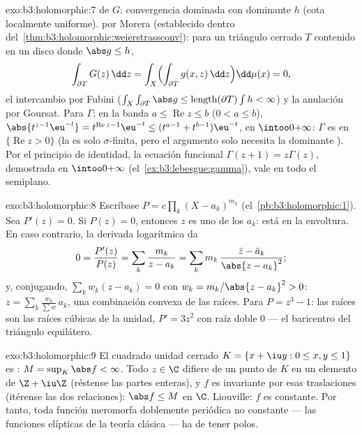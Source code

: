 \begin{solution}{exo:b3:holomorphic:7}
 de $G$: convergencia
dominada con dominante $h$ (cota localmente uniforme).
 por Morera (establecido
dentro del~\cref{thm:b3:holomorphic:weierstrassconv}): para un triángulo
cerrado $T$ contenido en un disco donde $\abs g \leq h$,
\[
\int_{\partial T}G(z)\,\dd z =
\int_X\Bigl(\int_{\partial T}g(x, z)\,\dd z\Bigr)\dd\mu(x) =
0,
\]
el intercambio por Fubini ($\int_X\int_{\partial T}\abs
g \leq \operatorname{length}(\partial T)\int h < \infty$) y la anulación
 por Goursat. Para $\Gamma$: en la banda $a
\leq \operatorname{Re}z \leq b$ ($0 < a \leq b$),
$\abs{t^{z-1}\eu^{-t}} = t^{\operatorname{Re}z-1}\eu^{-t} \leq
(t^{a-1} + t^{b-1})\eu^{-t}$,  en
$\intoo0{+\infty}$: $\Gamma$ es
 en
$\{\operatorname{Re} z > 0\}$ (la
 es solo $\sigma$-finita, pero el
argumento solo necesita la dominante
). Por el principio de identidad,
la ecuación funcional $\Gamma(z + 1) = z\Gamma(z)$, demostrada en
$\intoo0{+\infty}$ (el~\cref{ex:b3:lebesgue:gamma}), vale en todo el
semiplano.
\end{solution}

\begin{solution}{exo:b3:holomorphic:8}
Escríbase $P = c\prod_k(X - a_k)^{m_k}$ (el~\cref{pb:b3:holomorphic:1}).
Sea $P'(z) = 0$. Si $P(z) = 0$, entonces $z$ es uno de los $a_k$: está
en la envoltura. En caso contrario, la derivada logarítmica da
\[
0 = \frac{P'(z)}{P(z)} = \sum_k\frac{m_k}{z - a_k}
= \sum_k m_k\,\frac{\bar z - \bar a_k}{\abs{z - a_k}^2} ;
\]
y, conjugando, $\sum_kw_k(z - a_k) = 0$ con $w_k = m_k/\abs{z -
a_k}^2 > 0$: $z = \sum_k\frac{w_k}{\sum w}\,a_k$, una combinación
convexa de las raíces. Para $P = z^3 - 1$: las raíces son las raíces
cúbicas de la unidad, $P' = 3z^2$ con raíz doble $0$ --- el baricentro
del triángulo equilátero.
\end{solution}

\begin{solution}{exo:b3:holomorphic:9}
El cuadrado unidad cerrado $K = \{x + \iu y : 0 \leq x, y \leq
1\}$ es :
$M = \sup_K\abs f < \infty$. Todo $z \in \C$ difiere de un punto de $K$
en un elemento de $\Z + \iu\Z$ (réstense las partes enteras), y $f$ es
invariante por esas traslaciones (itérense las dos relaciones):
$\abs f \leq M$ en $\C$. Liouville: $f$ es constante. Por tanto, toda
función meromorfa doblemente periódica no constante --- las funciones
elípticas de la teoría clásica --- ha de tener polos.
\end{solution}

